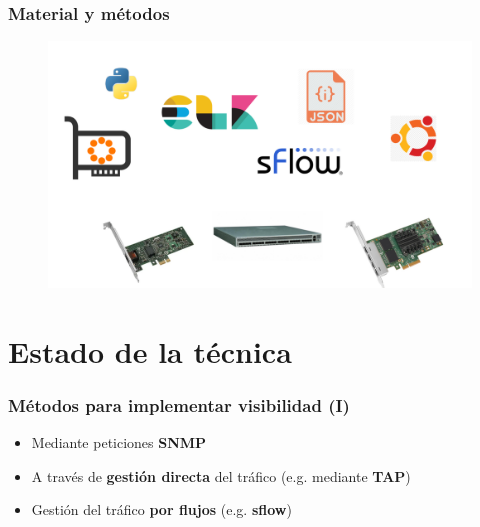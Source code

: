 \documentclass{beamer}
\begin{document}

\begin{frame}
\frametitle{Material y métodos}

\begin{figure}[H]
	\centering
	\includegraphics[scale=0.30]{material.png}
	\label{material}
\end{figure}

\end{frame}

\section{Estado de la técnica}


\begin{frame}

\frametitle{Métodos para implementar visibilidad (I)}
\begin{itemize}
	\item Mediante peticiones \textbf{SNMP}
	\item A través de \textbf{gestión directa} del tráfico (e.g. mediante \textbf{TAP})
	\item Gestión del tráfico \textbf{por flujos} (e.g. \textbf{sflow})
\end{itemize}

\end{frame}
\end{document}
